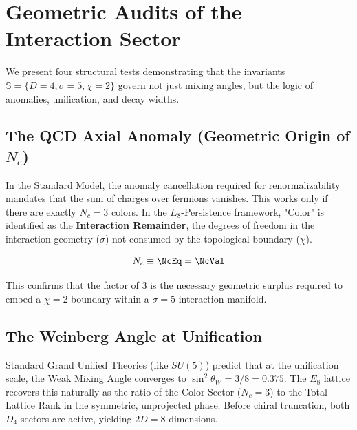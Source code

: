 
\section*{Geometric Audits of the Interaction Sector}

We present four structural tests demonstrating that the invariants $\mathbb{S} = \{D=4, \sigma=5, \chi=2\}$ govern not just mixing angles, but the logic of anomalies, unification, and decay widths.

\subsection{The QCD Axial Anomaly (Geometric Origin of \texorpdfstring{$N_c$}{Nc})}
In the Standard Model, the anomaly cancellation required for renormalizability mandates that the sum of charges over fermions vanishes. This works only if there are exactly $N_c=3$ colors. In the $E_8$-Persistence framework, "Color" is identified as the \textbf{Interaction Remainder}, the degrees of freedom in the interaction geometry ($\sigma$) not consumed by the topological boundary ($\chi$).

\begin{equation}
    N_c \equiv \NcEq = \NcVal
\end{equation}

This confirms that the factor of 3 is the necessary geometric surplus required to embed a $\chi=2$ boundary within a $\sigma=5$ interaction manifold.

\subsection{The Weinberg Angle at Unification}
Standard Grand Unified Theories (like $SU(5)$) predict that at the unification scale, the Weak Mixing Angle converges to $\sin^2 \theta_W = 3/8 = 0.375$. The $E_8$ lattice recovers this naturally as the ratio of the Color Sector ($N_c=3$) to the Total Lattice Rank in the symmetric, unprojected phase. Before chiral truncation, both $D_4$ sectors are active, yielding $2D=8$ dimensions.


